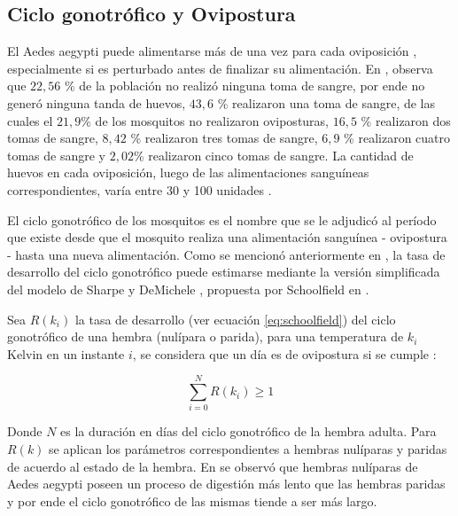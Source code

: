 \subsection{Ciclo gonotrófico y Ovipostura}
\label{subsec:cap4-ciclo-gontrofico-ovipostura}
El Aedes aegypti puede alimentarse más de una vez para cada oviposición \cite{scott1993detection},
especialmente si es perturbado antes de finalizar su alimentación. En \cite{osoriopontificia},
observa que  $22,56$ \% de la población no realizó ninguna toma de sangre, por ende no generó
ninguna tanda de huevos, $43,6$ \% realizaron una toma de sangre, de las cuales el $21,9$\% de los
mosquitos no realizaron oviposturas, $16,5$ \% realizaron dos tomas de sangre, $8,42$ \% realizaron
tres tomas de sangre, $6,9$ \% realizaron cuatro tomas de sangre y $2,02 $\% realizaron cinco tomas
de sangre. La cantidad de huevos en cada oviposición, luego de las alimentaciones sanguíneas
correspondientes, varía entre 30 y 100 unidades \cite{luevano1993ciclo, beltran2001bionomia,cabezas2005dengue}.

El ciclo gonotrófico de los mosquitos es el nombre que se le adjudicó al período que existe desde
que el mosquito realiza una alimentación sanguínea - ovipostura - hasta una nueva alimentación.
Como se mencionó anteriormente en , la tasa de desarrollo
del ciclo gonotrófico puede estimarse mediante la versión simplificada del modelo de Sharpe y DeMichele \cite{sharpe1977reaction}, propuesta por Schoolfield en \cite{schoolfield1981non}.

Sea $R(k_{i})$ la tasa de desarrollo (ver ecuación \eqref{eq:schoolfield}) del ciclo gonotrófico
de una hembra (nulípara o parida), para una temperatura de $k_{i}$ Kelvin en un instante $i$, se
considera que un día es de ovipostura si se cumple :

\begin{equation}
\label{eq:ciclo-gonotrofico-ovipostura}
    \sum_{i=0}^{N} R(k_{i}) \geq 1
\end{equation}

Donde $N$ es la duración en días del ciclo gonotrófico de la hembra adulta. Para $R(k)$ se aplican
los parámetros correspondientes a hembras nulíparas y paridas de acuerdo al estado de la hembra.
En \cite{edman1987host} se observó que hembras nulíparas de Aedes aegypti poseen un proceso de
digestión más lento que las hembras paridas y por ende el ciclo gonotrófico de las mismas tiende
a ser más largo.
